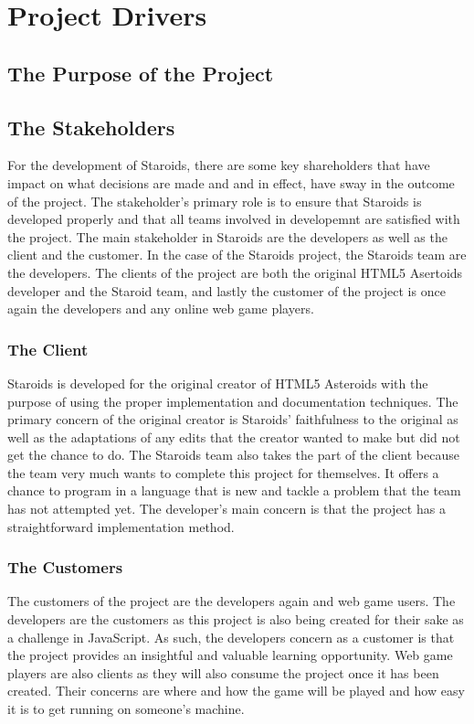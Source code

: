 \documentclass[12pt, titlepage]{article}
\begin{document}
\section{Project Drivers}

\subsection{The Purpose of the Project}

\subsection{The Stakeholders}
For the development of Staroids, there are some key shareholders that have impact on what decisions are made and and in effect, have sway in the outcome of the project. The stakeholder's primary role is to ensure that Staroids is developed properly and that all teams involved in developemnt are satisfied with the project. The main stakeholder in Staroids are the developers as well as the client and the customer. In the case of the Staroids project, the Staroids team are the developers. The clients of the project are both the original HTML5 Asertoids developer and the Staroid team, and lastly the customer of the project is once again the developers and any online web game players.\\

\subsubsection{The Client}
Staroids is developed for the original creator of HTML5 Asteroids with the purpose of using the proper implementation and documentation techniques. The primary concern of the original creator is Staroids' faithfulness to the original as well as the adaptations of any edits that the creator wanted to make but did not get the chance to do. The Staroids team also takes the part of the client because the team very much wants to complete this project for themselves. It offers a chance to program in a language that is new and tackle a problem that the team has not attempted yet. The developer's main concern is that the project has a straightforward implementation method.\\

\subsubsection{The Customers}
The customers of the project are the developers again and web game users. The developers are the customers as this project is also being created for their sake as a challenge in JavaScript. As such, the developers concern as a customer is that the project provides an insightful and valuable learning opportunity. Web game players are also clients as they will also consume the project once it has been created. Their concerns are where and how the game will be played and how easy it is to get running on someone's machine.\\
\end{document}
